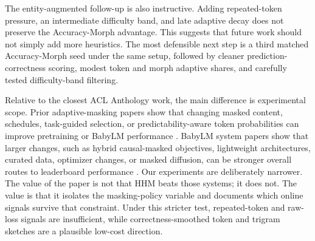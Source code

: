 The entity-augmented follow-up is also instructive. Adding repeated-token pressure, an intermediate difficulty band, and late adaptive decay does not preserve the Accuracy-Morph advantage. This suggests that future work should not simply add more heuristics. The most defensible next step is a third matched Accuracy-Morph seed under the same setup, followed by cleaner prediction-correctness scoring, modest token and morph adaptive shares, and carefully tested difficulty-band filtering.

Relative to the closest ACL Anthology work, the main difference is experimental scope. Prior adaptive-masking papers show that changing masked content, schedules, task-guided selection, or predictability-aware token probabilities can improve pretraining or BabyLM performance \citep{gu2020train,lee2022efficient,yang2023learning,wilf2023difference,edman2025mask}. BabyLM system papers show that larger changes, such as hybrid causal-masked objectives, lightweight architectures, curated data, optimizer changes, or masked diffusion, can be stronger overall routes to leaderboard performance \citep{hu2024babylm,charpentier2024gptbert,yu2024antlm,haller2025sample,kosmopoulou2025masked}. Our experiments are deliberately narrower. The value of the paper is not that HHM beats those systems; it does not. The value is that it isolates the masking-policy variable and documents which online signals survive that constraint. Under this stricter test, repeated-token and raw-loss signals are insufficient, while correctness-smoothed token and trigram sketches are a plausible low-cost direction.
